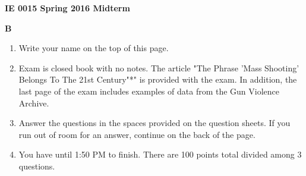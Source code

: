 \documentclass[12pt, letter, addpoints]{exam}
\begin{document}



\centering
{\bf IE 0015 Spring 2016 Midterm}

\centering
{\bf B}





\begin{enumerate}
\def\labelenumi{\arabic{enumi}.}
\itemsep1pt\parskip0pt
\item
  Write your name on the top of this page.
\item
  Exam is closed book with no notes. The article "The Phrase 'Mass Shooting' Belongs To The 21st Century"*" is provided with the exam. In addition, the last page of the exam includes examples of data from the Gun Violence Archive.
\item
  Answer the questions in the spaces provided on the question sheets. If you run out of room for an answer, continue on the back of the page.
\item
  You have until 1:50 PM to finish. There are 100 points total divided among 3 questions.
\end{enumerate}
\end{document}
